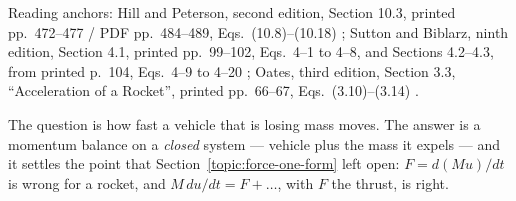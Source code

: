 
Reading anchors: Hill and Peterson, second edition, Section 10.3,
printed pp.~472--477 / PDF pp.~484--489, Eqs.~(10.8)--(10.18)
\cite{hillpeterson}; Sutton and Biblarz, ninth edition, Section 4.1,
printed pp.~99--102, Eqs.~4--1 to 4--8, and Sections 4.2--4.3, from printed
p.~104, Eqs.~4--9 to 4--20 \cite{sutton}; Oates, third edition,
Section 3.3, ``Acceleration of a Rocket'', printed pp.~66--67,
Eqs.~(3.10)--(3.14) \cite{oates}.

The question is how fast a vehicle that is losing mass moves. The answer is
a momentum balance on a \emph{closed} system --- vehicle plus the mass it
expels --- and it settles the point that
Section~\ref{topic:force-one-form} left open: $F=d(Mu)/dt$ is wrong for a
rocket, and $M\,du/dt=F+\dots$, with $F$ the thrust, is right.


